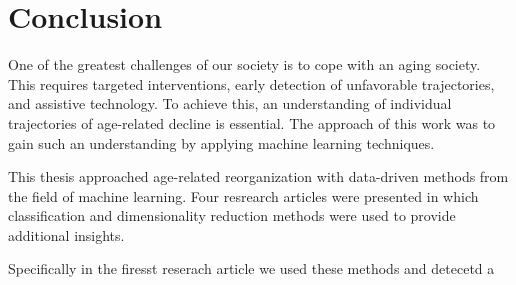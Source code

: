 \section{Conclusion}
One of the greatest challenges of our society is to cope with an aging society. This requires targeted interventions, early detection of unfavorable trajectories, and assistive technology. To achieve this, an understanding of individual trajectories of age-related decline is essential. The approach of this work was to gain such an understanding by applying machine learning techniques. 



This thesis approached age-related reorganization with data-driven methods from the field of machine learning. Four resrearch articles were presented in which classification and dimensionality reduction methods were used to provide additional insights. 




Specifically in the firesst reserach article we used these methods and detecetd a 


